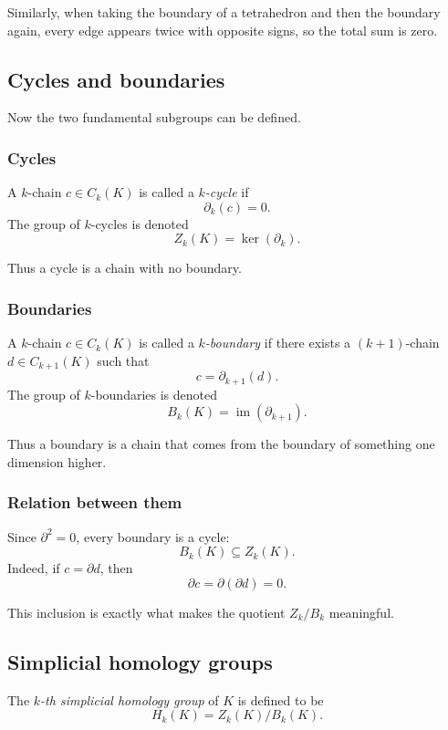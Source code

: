\documentclass[12pt,a4paper]{article}
\theoremstyle{notespace}
\begin{document}
Similarly, when taking the boundary of a tetrahedron and then the boundary again, every edge appears twice with opposite signs, so the total sum is zero.

\subsection{Cycles and boundaries}

Now the two fundamental subgroups can be defined.

\subsubsection{Cycles}

A \(k\)-chain \(c\in C_k(K)\) is called a \emph{\(k\)-cycle} if
\[
\partial_k(c)=0.
\]
The group of \(k\)-cycles is denoted
\[
Z_k(K)=\ker(\partial_k).
\]

Thus a cycle is a chain with no boundary.

\subsubsection{Boundaries}

A \(k\)-chain \(c\in C_k(K)\) is called a \emph{\(k\)-boundary} if there exists a \((k+1)\)-chain \(d\in C_{k+1}(K)\) such that
\[
c=\partial_{k+1}(d).
\]
The group of \(k\)-boundaries is denoted
\[
B_k(K)=\operatorname{im}(\partial_{k+1}).
\]

Thus a boundary is a chain that comes from the boundary of something one dimension higher.

\subsubsection{Relation between them}

Since \(\partial^2=0\), every boundary is a cycle:
\[
B_k(K)\subseteq Z_k(K).
\]
Indeed, if \(c=\partial d\), then
\[
\partial c=\partial(\partial d)=0.
\]

This inclusion is exactly what makes the quotient \(Z_k/B_k\) meaningful.

\subsection{Simplicial homology groups}

The \emph{\(k\)-th simplicial homology group} of \(K\) is defined to be
\[
H_k(K)=Z_k(K)/B_k(K).
\]
\end{document}
